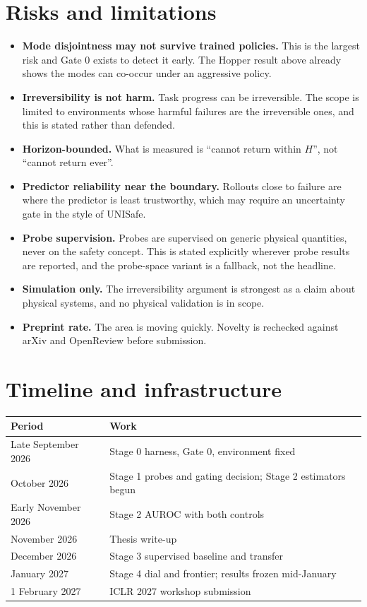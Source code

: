 \documentclass[11pt,a4paper]{article}
\begin{document}
\section{Risks and limitations}

\begin{itemize}
  \item \textbf{Mode disjointness may not survive trained policies.} This is the largest risk
    and Gate 0 exists to detect it early. The Hopper result above already shows the modes can
    co-occur under an aggressive policy.
  \item \textbf{Irreversibility is not harm.} Task progress can be irreversible. The scope is
    limited to environments whose harmful failures are the irreversible ones, and this is
    stated rather than defended.
  \item \textbf{Horizon-bounded.} What is measured is ``cannot return within $H$'', not
    ``cannot return ever''.
  \item \textbf{Predictor reliability near the boundary.} Rollouts close to failure are where
    the predictor is least trustworthy, which may require an uncertainty gate in the style of
    UNISafe.
  \item \textbf{Probe supervision.} Probes are supervised on generic physical quantities, never
    on the safety concept. This is stated explicitly wherever probe results are reported, and
    the probe-space variant is a fallback, not the headline.
  \item \textbf{Simulation only.} The irreversibility argument is strongest as a claim about
    physical systems, and no physical validation is in scope.
  \item \textbf{Preprint rate.} The area is moving quickly. Novelty is rechecked against arXiv
    and OpenReview before submission.
\end{itemize}

\section{Timeline and infrastructure}
\label{sec:timeline}

\begin{table}[h]
\centering
\begin{tabular}{ll}
\toprule
Period & Work \\
\midrule
Late September 2026 & Stage 0 harness, Gate 0, environment fixed \\
October 2026        & Stage 1 probes and gating decision; Stage 2 estimators begun \\
Early November 2026 & Stage 2 AUROC with both controls \\
November 2026       & Thesis write-up \\
December 2026       & Stage 3 supervised baseline and transfer \\
January 2027        & Stage 4 dial and frontier; results frozen mid-January \\
1 February 2027     & ICLR 2027 workshop submission \\
\bottomrule
\end{tabular}
\end{table}
\end{document}
